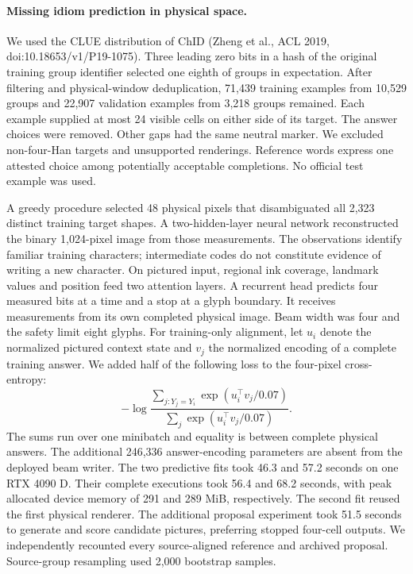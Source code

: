 \documentclass[12pt,a4paper]{article}
\providecommand{\DIFadd}[1]{{\protect\color{blue} \sf #1}} %
\begin{document}
\paragraph{\DIFadd{Missing idiom prediction in physical space.}}
\DIFadd{We used the CLUE distribution of ChID (Zheng et al., ACL 2019,
doi:10.18653/v1/P19-1075). Three leading zero bits in a hash of the
original training group identifier selected one eighth of groups in
expectation. After filtering and physical-window deduplication, 71,439
training examples from 10,529 groups and 22,907 validation examples
from 3,218 groups remained. Each example supplied at most 24 visible
cells on either side of its target. The answer choices were removed.
Other gaps had the same neutral marker. We excluded non-four-Han targets
and unsupported renderings. Reference words express one attested choice
among potentially acceptable completions. No official test example was used.
}

\DIFadd{A greedy procedure selected 48 physical pixels that disambiguated all 2,323
distinct training target shapes. A two-hidden-layer neural network
reconstructed the binary 1,024-pixel image from those measurements.
The observations identify familiar training characters; intermediate codes
do not constitute evidence of writing a new character. On pictured input,
regional ink coverage, landmark values and position feed two attention
layers. A recurrent head predicts four measured bits at a time and a stop
at a glyph boundary. It receives measurements from its own completed
physical image. Beam width was four and the safety limit eight glyphs.
For training-only alignment, let $u_i$ denote the normalized pictured
context state and $v_j$ the normalized encoding of a complete training
answer. We added half of the following loss to the four-pixel
cross-entropy:
}\[
-\log\frac{\sum_{j:Y_j=Y_i}\exp(u_i^\top v_j/0.07)}{\sum_j\exp(u_i^\top v_j/0.07)}.
\]
\DIFadd{The sums run over one minibatch and equality is between complete physical
answers. The additional 246,336 answer-encoding parameters are absent
from the deployed beam writer. The two predictive fits took 46.3 and
57.2 seconds on one RTX 4090 D. Their complete executions took 56.4 and
68.2 seconds, with peak allocated device memory of 291 and 289 MiB,
respectively. The second fit reused the first physical renderer.
The additional proposal experiment took 51.5 seconds to generate and
score candidate pictures, preferring stopped four-cell outputs. We
independently recounted every source-aligned reference and archived
proposal. Source-group resampling used 2,000 bootstrap samples.
}
\end{document}
